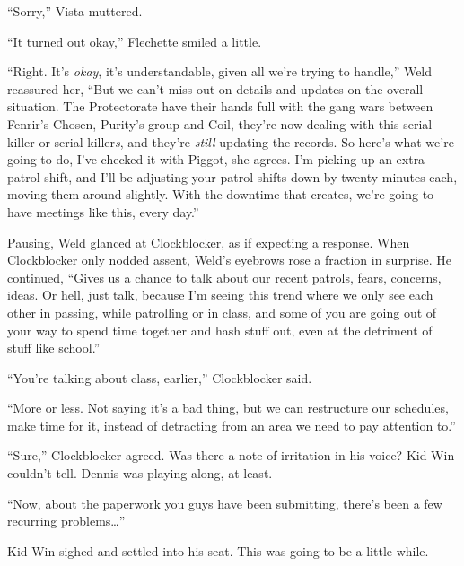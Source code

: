 ``Sorry,'' Vista muttered.



``It turned out okay,'' Flechette smiled a little.



``Right.  It's \emph{okay}, it's understandable, given all we're trying to handle,'' Weld reassured her, ``But we can't miss out on details and updates on the overall situation.  The Protectorate have their hands full with the gang wars between Fenrir's Chosen, Purity's group and Coil,  they're now dealing with this serial killer or serial killer\emph{s}, and they're \emph{still} updating the records.  So here's what we're going to do, I've checked it with Piggot, she agrees.  I'm picking up an extra patrol shift, and I'll be adjusting your patrol shifts down by twenty minutes each, moving them around slightly.  With the downtime that creates, we're going to have meetings like this, every day.''



Pausing, Weld glanced at Clockblocker, as if expecting a response.  When Clockblocker only nodded assent, Weld's eyebrows rose a fraction in surprise.  He continued, ``Gives us a chance to talk about our recent patrols, fears, concerns, ideas.  Or hell, just talk, because I'm seeing this trend where we only see each other in passing, while patrolling or in class, and some of you are going out of your way to spend time together and hash stuff out, even at the detriment of stuff like school.''



``You're talking about class, earlier,'' Clockblocker said.



``More or less.  Not saying it's a bad thing, but we can restructure our schedules, make time for it, instead of detracting from an area we need to pay attention to.''



``Sure,'' Clockblocker agreed.  Was there a note of irritation in his voice?  Kid Win couldn't tell.  Dennis was playing along, at least.



``Now, about the paperwork you guys have been submitting, there's been a few recurring problems\ldots''



Kid Win sighed and settled into his seat.  This was going to be a little while.



\blacksquare



